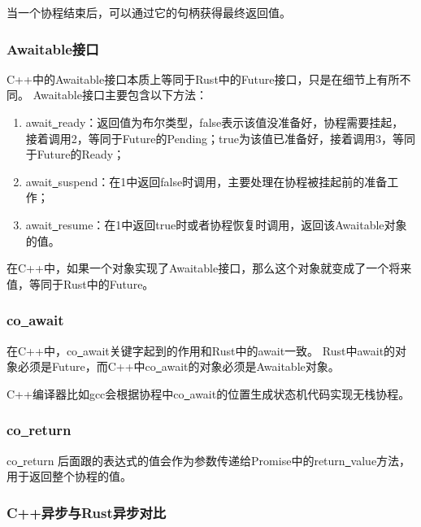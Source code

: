 \documentclass[supercite]{HustGraduPaper}
\theoremstyle{definition}
\begin{document}
当一个协程结束后，可以通过它的句柄获得最终返回值。\par

\subsubsection{Awaitable接口}

C++中的Awaitable接口本质上等同于Rust中的Future接口，只是在细节上有所不同。
Awaitable接口主要包含以下方法：

\begin{enumerate}
  \item await\underline{~}ready：返回值为布尔类型，false表示该值没准备好，协程需要挂起，
    接着调用2，等同于Future的Pending；true为该值已准备好，接着调用3，等同于Future的Ready；
  \item await\underline{~}suspend：在1中返回false时调用，主要处理在协程被挂起前的准备工作；
  \item await\underline{~}resume：在1中返回true时或者协程恢复时调用，返回该Awaitable对象的值。
\end{enumerate}

在C++中，如果一个对象实现了Awaitable接口，那么这个对象就变成了一个将来值，等同于Rust中的Future。\par

\subsubsection{co\underline{~}await}
在C++中，co\underline{~}await关键字起到的作用和Rust中的await一致。
Rust中await的对象必须是Future，而C++中co\underline{~}await的对象必须是Awaitable对象。\par

C++编译器比如gcc会根据协程中co\underline{~}await的位置生成状态机代码实现无栈协程。\par

\subsubsection{co\underline{~}return}

co\underline{~}return 后面跟的表达式的值会作为参数传递给Promise中的return\underline{~}value方法，
用于返回整个协程的值。\par

\subsubsection{C++异步与Rust异步对比}
\end{document}
